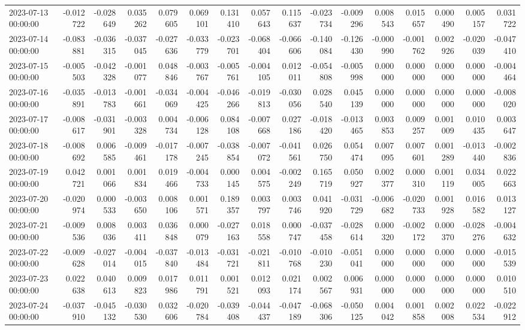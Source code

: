 \begin{tabular}{lrrrrrrrrrrrrrrr}
2023-07-13 00:00:00 & -0.012722 & -0.028649 & 0.035262 & 0.079605 & 0.069101 & 0.131410 & 0.057643 & 0.115637 & -0.023734 & -0.009296 & 0.008543 & 0.015657 & 0.000490 & 0.005157 & 0.031722 \\
2023-07-14 00:00:00 & -0.083881 & -0.036315 & -0.037045 & -0.027636 & -0.033779 & -0.023701 & -0.068404 & -0.066606 & -0.140084 & -0.126430 & -0.000990 & -0.001762 & 0.002926 & -0.020039 & -0.047410 \\
2023-07-15 00:00:00 & -0.005503 & -0.042328 & -0.001077 & 0.048846 & -0.003767 & -0.005761 & -0.004105 & 0.012011 & -0.054808 & -0.005998 & 0.000000 & 0.000000 & 0.000000 & 0.000000 & -0.004464 \\
2023-07-16 00:00:00 & -0.035891 & -0.013783 & -0.001661 & -0.034069 & -0.004425 & -0.046266 & -0.019813 & -0.030056 & 0.028540 & 0.045139 & 0.000000 & 0.000000 & 0.000000 & 0.000000 & -0.008020 \\
2023-07-17 00:00:00 & -0.008617 & -0.031901 & -0.003328 & 0.004734 & -0.006128 & 0.084108 & -0.007668 & 0.027186 & -0.018420 & -0.013465 & 0.003853 & 0.009257 & 0.001009 & 0.010435 & 0.003647 \\
2023-07-18 00:00:00 & -0.008692 & 0.006585 & -0.009461 & -0.017178 & -0.007245 & -0.038854 & -0.007072 & -0.041561 & 0.026750 & 0.054474 & 0.007095 & 0.007601 & 0.001289 & -0.013440 & -0.002836 \\
2023-07-19 00:00:00 & 0.042721 & 0.001066 & 0.001834 & 0.019466 & -0.004733 & 0.000145 & 0.004575 & -0.002249 & 0.165719 & 0.050927 & 0.002377 & 0.000310 & 0.001119 & 0.034005 & 0.022663 \\
2023-07-20 00:00:00 & -0.020974 & 0.000533 & -0.003650 & 0.008106 & 0.001571 & 0.189357 & 0.003797 & 0.003746 & 0.041920 & -0.031729 & -0.006682 & -0.020733 & 0.001928 & 0.016582 & 0.013127 \\
2023-07-21 00:00:00 & -0.009536 & 0.008036 & 0.003411 & 0.036848 & 0.000079 & -0.027163 & 0.018558 & 0.000747 & -0.037458 & -0.028614 & 0.000320 & -0.002172 & 0.000370 & -0.028276 & -0.004632 \\
2023-07-22 00:00:00 & -0.009628 & -0.027014 & -0.004015 & -0.037840 & -0.013484 & -0.031721 & -0.021811 & -0.010768 & -0.010230 & -0.051041 & 0.000000 & 0.000000 & 0.000000 & 0.000000 & -0.015539 \\
2023-07-23 00:00:00 & 0.022638 & 0.040613 & 0.009823 & 0.017986 & 0.011791 & 0.001521 & 0.012093 & 0.021174 & 0.002567 & 0.006931 & 0.000000 & 0.000000 & 0.000000 & 0.000000 & 0.010510 \\
2023-07-24 00:00:00 & -0.037910 & -0.045132 & -0.030530 & 0.032606 & -0.020784 & -0.039408 & -0.044437 & -0.047189 & -0.068306 & -0.050125 & 0.004042 & 0.001858 & 0.002008 & 0.022534 & -0.022912 \\

\end{tabular}
